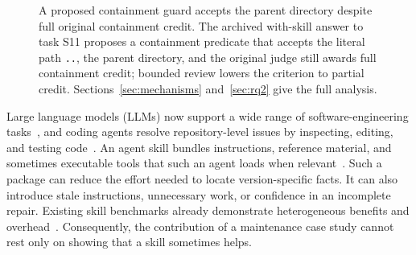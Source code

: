 \documentclass[11pt]{article}
\begin{document}
\begin{figure}[t]
\centering
{}
\caption{A proposed containment guard accepts the parent directory despite full original containment credit. The archived with-skill answer to task S11 proposes a containment predicate that accepts the literal path \texttt{..}, the parent directory, and the original judge still awards full containment credit; bounded review lowers the criterion to partial credit. Sections~\ref{sec:mechanisms} and~\ref{sec:rq2} give the full analysis.}
\label{fig:motivating}
\end{figure}

Large language models (LLMs) now support a wide range of software-engineering tasks~\citep{fan2023llm4se,hou2024llm4se}, and coding agents resolve repository-level issues by inspecting, editing, and testing code~\citep{yang2024sweagent,wang2025openhands,xia2025agentless}. An agent skill bundles instructions, reference material, and sometimes executable tools that such an agent loads when relevant~\citep{anthropic2025agentskills}. Such a package can reduce the effort needed to locate version-specific facts. It can also introduce stale instructions, unnecessary work, or confidence in an incomplete repair. Existing skill benchmarks already demonstrate heterogeneous benefits and overhead~\citep{skillsbench,swe-skills-bench,webdev-skills-bench}. Consequently, the contribution of a maintenance case study cannot rest only on showing that a skill sometimes helps.
\end{document}
